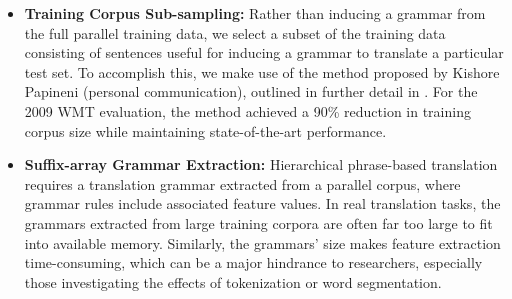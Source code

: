 \documentclass[11pt]{article}
\newcommand{\ignore}[1]{}
\begin{document}
\begin{itemize}
\item \textbf{Training Corpus Sub-sampling:} Rather than inducing a grammar from
the full parallel training data, we select a subset of the training data
consisting of sentences useful for inducing a grammar to translate a particular
test set.  To accomplish this, we make use of the method proposed by Kishore
Papineni (personal communication), outlined in further detail in \cite{Joshua-WMT}.
For the 2009 WMT evaluation, the method achieved a 90\% reduction in training
corpus size while maintaining state-of-the-art performance.


\item \textbf{Suffix-array Grammar Extraction:} Hierarchical phrase-based
translation requires a translation grammar extracted from a parallel corpus,
where grammar rules include associated feature values. In real translation tasks,
the grammars extracted from large training corpora are often far too large to fit
into available memory. Similarly, the grammars' size makes feature extraction
time-consuming, which can be a major hindrance to researchers, especially those
investigating the effects of tokenization or word segmentation.


\end{itemize}
\end{document}
